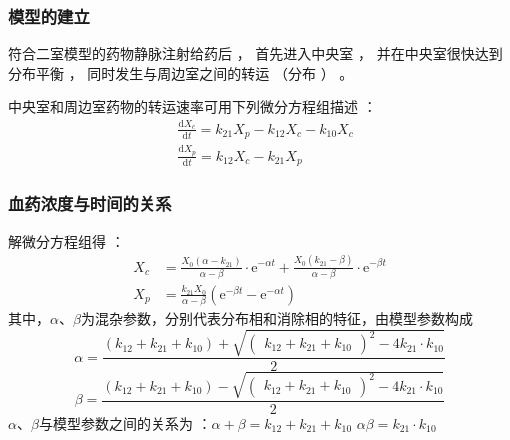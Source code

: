 \documentclass[dvipsnames, svgnames, x11names]{beamer}
\begin{document}
\begin{frame}
    \frametitle{模型的建立}
    符合二室模型的药物静脉注射给药后 ， 首先进入中央室 ， 并在中央室很快达到分布平衡 ， 同时发生与周边室之间的转运 （分布 ） 。

    \begin{center}
    \end{center}
    中央室和周边室药物的转运速率可用下列微分方程组描述 ：
    \[
        \begin{aligned}
            &\frac{\mathrm{d}X_{c}}{\mathrm{d}t} =k_{21}X_{p}-k_{{12}}X_{c}-k_{{10}}X_{c}  \\
            &\frac{\mathrm{d}X_{p}}{\mathrm{d}t} =k_{{12}}X_{c}-k_{{21}}X_{p} 
        \end{aligned}
    \]

\end{frame}


\begin{frame}
    \frametitle{血药浓度与时间的关系}
    解微分方程组得 ：
    \[
        \begin{aligned}
            X_{c}& = \frac{X_{0}(\alpha - k_{21})}{\alpha - \beta}\cdot \mathrm{e}^{-\alpha t} + \frac{X_{0}(k_{21}- \beta)}{\alpha - \beta}\cdot \mathrm{e}^{-\beta t} \\
            X_{p}& = \frac{k_{21}X_{0}}{\alpha - \beta}(\mathrm{e}^{-\beta t}-\mathrm{e}^{-\alpha t})
        \end{aligned}
    \]
    其中，$\alpha$、$\beta$为混杂参数，分别代表分布相和消除相的特征，由模型参数构成
    \[
        \alpha=\frac{(k_{12}+k_{21}+k_{10})+\sqrt{(\begin{array}{c}k_{12}+k_{21}+k_{10}\end{array})^2-4k_{21}\cdot k_{10}}}{2}
    \]
    \[
        \beta=\frac{(k_{12}+k_{21}+k_{10})-\sqrt{(\begin{array}{c}k_{12}+k_{21}+k_{10}\end{array})^2-4k_{21}\cdot k_{10}}}{2}
    \]
    $\alpha$、$\beta$与模型参数之间的关系为 ：$\alpha + \beta = k_{12}+k_{21}+k_{10}$ \qquad $\alpha  \beta = k_{21}\cdot k_{10}$
\end{frame}
\end{document}
